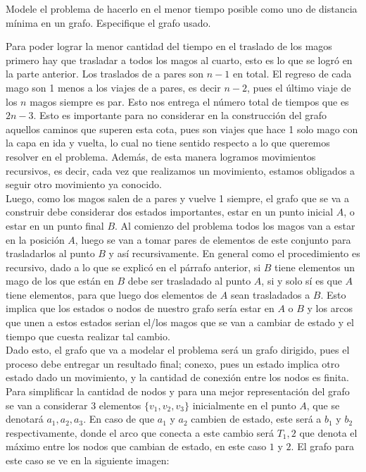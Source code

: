 \documentclass[letterpaper,10pt,table, dvipsnames]{article}
\begin{document}
\newpage

\begin{tcolorbox}
 Modele el problema de hacerlo en el menor tiempo posible como uno de distancia mínima en un grafo. Especifique el grafo usado.
\end{tcolorbox}

Para poder lograr la menor cantidad del tiempo en el traslado de los magos primero hay que trasladar a todos los magos al cuarto, esto es lo que se logró en la parte anterior. Los traslados de a pares son $n-1$ en total. El regreso de cada mago son 1 menos a los viajes de a pares, es decir $n-2$, pues el último viaje de los $n$ magos siempre es par. Esto nos entrega el número total de tiempos que es $2n-3$. Esto es importante para no considerar en la construcción del grafo aquellos caminos que superen esta cota, pues son viajes que hace 1 solo mago con la capa en ida y vuelta, lo cual no tiene sentido respecto a lo que queremos resolver en el problema. Además, de esta manera logramos movimientos recursivos, es decir, cada vez que realizamos un movimiento, estamos obligados a seguir otro movimiento ya conocido.\\

Luego, como los magos salen de a pares y vuelve 1 siempre, el grafo que se va a construir debe considerar dos estados importantes, estar en un punto inicial $A$, o estar en un punto final $B$. Al comienzo del problema todos los magos van a estar en la posición $A$, luego se van a tomar pares de elementos de este conjunto para trasladarlos al punto $B$ y así recursivamente. En general como el procedimiento es recursivo, dado a lo que se explicó en el párrafo anterior, si $B$ tiene elementos un mago de los que están en $B$ debe ser trasladado al punto $A$, si y solo sí es que $A$ tiene elementos, para que luego dos elementos de $A$ sean trasladados a $B$. Esto implica que los estados o nodos de nuestro grafo sería estar en $A$ o $B$ y los arcos que unen a estos estados serian el/los magos que se van a cambiar de estado y el tiempo que cuesta realizar tal cambio.\\

Dado esto, el grafo que va a modelar el problema será un grafo dirigido, pues el proceso debe entregar un resultado final; conexo, pues un estado implica otro estado dado un movimiento, y la cantidad de conexión entre los nodos es finita.\\

Para simplificar la cantidad de nodos y para una mejor representación del grafo se van a considerar 3 elementos $\{v_{1},v_2, v_3\}$ inicialmente en el punto $A$, que se denotará $a_1, a_2, a_3$. En caso de que $a_1$ y $a_2$ cambien de estado, este será a $b_1$ y $b_2$ respectivamente, donde el arco que conecta a este cambio será $T_1,2$ que denota el máximo entre los nodos que cambian de estado, en este caso $1$ y $2$. El grafo para este caso se ve en la siguiente imagen:
\end{document}

